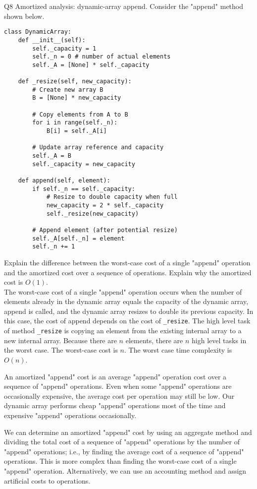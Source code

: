 \documentclass{article}
\begin{document}
Q8 Amortized analysis: dynamic-array append. Consider the "append" method shown below.

\begin{verbatim}
class DynamicArray:
    def __init__(self):
        self._capacity = 1
        self._n = 0 # number of actual elements
        self._A = [None] * self._capacity

    def _resize(self, new_capacity):
        # Create new array B
        B = [None] * new_capacity

        # Copy elements from A to B
        for i in range(self._n):
            B[i] = self._A[i]

        # Update array reference and capacity
        self._A = B
        self._capacity = new_capacity

    def append(self, element):
        if self._n == self._capacity:
            # Resize to double capacity when full
            new_capacity = 2 * self._capacity
            self._resize(new_capacity)

        # Append element (after potential resize)
        self._A[self._n] = element
        self._n += 1
\end{verbatim}

Explain the difference between the worst-case cost of a single "append" operation and the amortized cost over a sequence of operations. Explain why the amortized cost is $O(1)$.\\

The worst-case cost of a single "append" operation occurs when the number of elements already in the dynamic array equals the capacity of the dynamic array, append is called, and the dynamic array resizes to double its previous capacity. In this case, the cost of append depends on the cost of \texttt{\_resize}. The high level task of method \texttt{\_resize} is copying an element from the existing internal array to a new internal array. Because there are $n$ elements, there are $n$ high level tasks in the worst case. The worst-case cost is $n$. The worst case time complexity is $O(n)$.

An amortized "append" cost is an average "append" operation cost over a sequence of "append" operations. Even when some "append" operations are occasionally expensive, the average cost per operation may still be low. Our dynamic array performs cheap "append" operations most of the time and expensive "append" operations occasionally.

We can determine an amortized "append" cost by using an aggregate method and dividing the total cost of a sequence of "append" operations by the number of "append" operations; i.e., by finding the average cost of a sequence of "append" operations. This is more complex than finding the worst-case cost of a single "append" operation. Alternatively, we can use an accounting method and assign artificial costs to operations.
\end{document}
